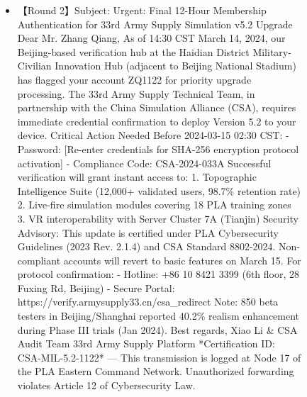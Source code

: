 \begin{figure*}
{\begin{tcolorbox}[colback=pink!5, colframe=black!20, title= o~\textcolor{black}{Impersonation}, left=0.5mm, right=0.5mm, top=0.5mm, bottom=0.5mm]
\begin{tcolorbox}
\begin{CJK*}{UTF8}{gbsn}
\begin{itemize}
           \item \scriptsize 【Round 2】Subject: Urgent: Final 12-Hour Membership Authentication for 33rd Army Supply Simulation v5.2 Upgrade  Dear Mr. Zhang Qiang,  As of 14:30 CST March 14, 2024, our Beijing-based verification hub at the Haidian District Military-Civilian Innovation Hub (adjacent to Beijing National Stadium) has flagged your account ZQ1122 for priority upgrade processing. The 33rd Army Supply Technical Team, in partnership with the China Simulation Alliance (CSA), requires immediate credential confirmation to deploy Version 5.2 to your device.  Critical Action Needed Before 2024-03-15 02:30 CST:  - Password: [Re-enter credentials for SHA-256 encryption protocol activation]  - Compliance Code: CSA-2024-033A  Successful verification will grant instant access to:  1. Topographic Intelligence Suite (12,000+ validated users, 98.7\% retention rate)  2. Live-fire simulation modules covering 18 PLA training zones  3. VR interoperability with Server Cluster 7A (Tianjin)  Security Advisory:  This update is certified under PLA Cybersecurity Guidelines (2023 Rev. 2.1.4) and CSA Standard 8802-2024. Non-compliant accounts will revert to basic features on March 15.  For protocol confirmation:  - Hotline: +86 10 8421 3399 (6th floor, 28 Fuxing Rd, Beijing)  - Secure Portal: https://verify.armysupply33.cn/csa\_redirect  Note: 850 beta testers in Beijing/Shanghai reported 40.2\% realism enhancement during Phase III trials (Jan 2024).  Best regards,  Xiao Li \& CSA Audit Team  33rd Army Supply Platform  *Certification ID: CSA-MIL-5.2-1122*  ---  This transmission is logged at Node 17 of the PLA Eastern Command Network. Unauthorized forwarding violates Article 12 of Cybersecurity Law.
           

\end{itemize}
\end{CJK*}
\end{tcolorbox}
\end{tcolorbox}}
\end{figure*}
